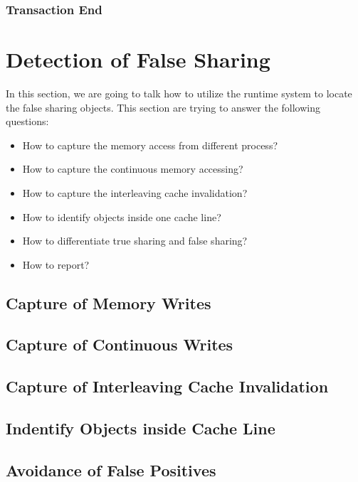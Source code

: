 \documentclass[10pt]{sigplanconf}
\begin{document}
\subsubsection{Transaction End}

\section{Detection of False Sharing}
In this section, we are going to talk how to utilize the runtime system to locate the false sharing objects.
This section are trying to answer the following questions:

\begin{itemize}
\item How to capture the memory access from different process?
\item How to capture the continuous memory accessing?
\item How to capture the interleaving cache invalidation? 
\item How to identify objects inside one cache line? 
\item How to differentiate true sharing and false sharing?
\item How to report?
\end{itemize}
\subsection{Capture of Memory Writes}
\subsection{Capture of Continuous Writes}
\subsection{Capture of Interleaving Cache Invalidation}
\subsection{Indentify Objects inside Cache Line}
\subsection{Avoidance of False Positives}
\end{document}
